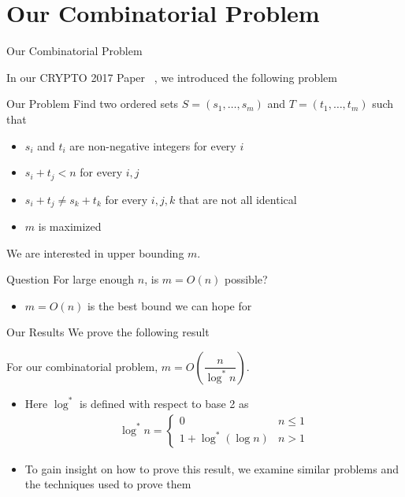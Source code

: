 \section{Our Combinatorial Problem}
\begin{frame}{Our Combinatorial Problem}

In our CRYPTO 2017 Paper ~\cite{BMN17}, we introduced the following problem

{
\begin{block}{Our Problem}
	Find two ordered sets $S = \left(s_1,\dotsc, s_m\right)$ and $T = \left(t_1,\dotsc, t_m\right)$ such that
	\begin{itemize}
		\item $s_i$ and $t_i$ are non-negative integers for every $i$
		\item $s_i + t_j < n$ for every $i,j$
		\item $s_i + t_j \neq s_k + t_k$ for every $i,j,k$ that are not all identical
		\item $m$ is maximized
	\end{itemize}
\end{block}}

We are interested in upper bounding $m$.

\begin{block}{Question}
	For large enough $n$, is $m = O(n)$ possible?
\end{block}
\begin{itemize}
	\item $m = O(n)$ is the best bound we can hope for
\end{itemize}

\end{frame}

\begin{frame}{Our Results}
	We prove the following result
	\begin{theorem}
		For our combinatorial problem, $m = O\left(\dfrac{n}{\log^*n}\right)$.
	\end{theorem}

\begin{itemize}
	\item Here $\log^*$ is defined with respect to base 2 as
	\begin{align*}
		\log^* n = \begin{cases}
			0 & n\leq 1\\
			1 + \log^*(\log n) & n > 1
		\end{cases}
	\end{align*}
	\item To gain insight on how to prove this result, we examine similar problems and the techniques used to prove them
\end{itemize}

\end{frame}

